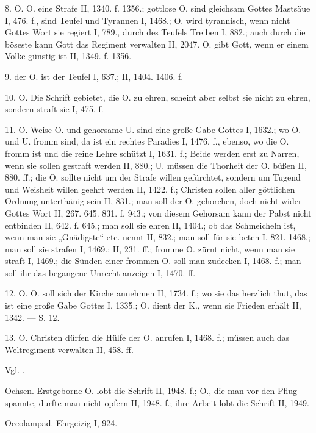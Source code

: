 8.  O.  O. eine Strafe II, 1340. f. 1356.; gottlose O. sind gleichsam Gottes Mastsäue I, 476. f., sind Teufel und Tyrannen I, 1468.; O. wird tyrannisch, wenn nicht Gottes Wort sie regiert I, 789., durch des Teufels Treiben I, 882.; auch durch die böseste kann Gott das Regiment verwalten II, 2047.  O. gibt Gott, wenn er einem Volke günstig ist II, 1349. f. 1356.

9.  der O. ist der Teufel I, 637.; II, 1404. 1406. f.

10.  O. Die Schrift gebietet, die O. zu ehren, scheint aber selbst sie nicht zu ehren, sondern straft sie I, 475. f.

11. O.  Weise O. und gehorsame U. sind eine große Gabe Gottes I, 1632.; wo O. und U. fromm sind, da ist ein rechtes Paradies I, 1476. f., ebenso, wo die O. fromm ist und die reine Lehre schützt I, 1631. f.; Beide werden erst zu Narren, wenn sie sollen gestraft werden II, 880.; U. müssen die Thorheit der O. büßen II, 880. ff.; die O. sollte nicht um der Strafe willen gefürchtet, sondern um Tugend und Weisheit willen geehrt werden II, 1422. f.; Christen sollen aller göttlichen Ordnung unterthänig sein II, 831.; man soll der O. gehorchen, doch nicht wider Gottes Wort II, 267. 645. 831. f. 943.; von diesem Gehorsam kann der Pabst nicht entbinden II, 642. f. 645.; man soll sie ehren II, 1404.; ob das Schmeicheln ist, wenn man sie „Gnädigste“ etc. nennt II, 832.; man soll für sie beten I, 821. 1468.; man soll sie strafen I, 1469.; II, 231. ff.; fromme O. zürnt nicht, wenn man sie straft I, 1469.; die Sünden einer frommen O. soll man zudecken I, 1468. f.; man soll ihr das begangene Unrecht anzeigen I, 1470. ff.

12. O.  O. soll sich der Kirche annehmen II, 1734. f.; wo sie das herzlich thut, das ist eine große Gabe Gottes I, 1335.; O. dient der K., wenn sie Frieden erhält II, 1342. — S.  12.

13.  O. Christen dürfen die Hülfe der O. anrufen I, 1468. f.; müssen auch das Weltregiment verwalten II, 458. ff.

Vgl. .

Ochsen. Erstgeborne O. lobt die Schrift II, 1948. f.; O., die man vor den Pflug spannte, durfte man nicht opfern II, 1948. f.; ihre Arbeit lobt die Schrift II, 1949.

Oecolampad. Ehrgeizig I, 924.

